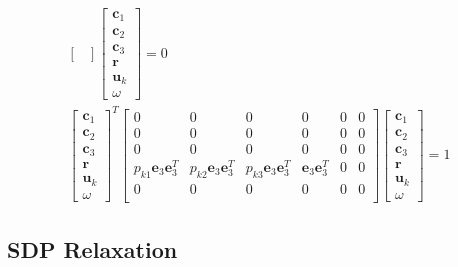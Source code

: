 \documentclass{article}
\begin{document}
\begin{align}
\begin{bmatrix}
    \end{bmatrix} 
    \begin{bmatrix}
        \mathbf{c}_1 \\
        \mathbf{c}_2 \\
        \mathbf{c}_3 \\
        \mathbf{r} \\
        \mathbf{u}_k \\
        \omega
    \end{bmatrix} = 0 \\
    \begin{bmatrix}
        \mathbf{c}_1 \\
        \mathbf{c}_2 \\
        \mathbf{c}_3 \\
        \mathbf{r} \\
        \mathbf{u}_k \\
        \omega
    \end{bmatrix}^T
    \begin{bmatrix}
        0 & 0 & 0 & 0 & 0 & 0 \\
        0 & 0 & 0 & 0 & 0 & 0 \\
        0 & 0 & 0 & 0 & 0 & 0 \\
        p_{k1}\mathbf{e}_3\mathbf{e}_3^T & p_{k2}\mathbf{e}_3\mathbf{e}_3^T & p_{k3}\mathbf{e}_3\mathbf{e}_3^T & \mathbf{e}_3\mathbf{e}_3^T & 0 & 0 \\
        0 & 0 & 0 & 0 & 0 & 0 \\
    \end{bmatrix} 
    \begin{bmatrix}
        \mathbf{c}_1 \\
        \mathbf{c}_2 \\
        \mathbf{c}_3 \\
        \mathbf{r} \\
        \mathbf{u}_k \\
        \omega
    \end{bmatrix} = 1 
\end{align}

\subsection{SDP Relaxation}
\end{document}
